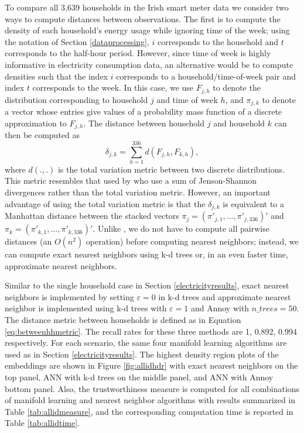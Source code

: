 \documentclass[11pt,a4paper,]{article}
\begin{document}
To compare all 3,639 households in the Irish smart meter data we consider two ways to compute distances between observations. The first is to compute the density of each household's energy usage while ignoring time of the week; using the notation of Section \ref{dataprocessing}, \(i\) corresponds to the household and \(t\) corresponds to the half-hour period. However, since time of week is highly informative in electricity consumption data, an alternative would be to compute densities such that the index \(i\) corresponds to a household/time-of-week pair and index \(t\) corresponds to the week. In this case, we use \(F_{j,h}\) to denote the distribution corresponding to household \(j\) and time of week \(h\), and \(\pi_{j,k}\) to denote a vector whose entries give values of a probability mass function of a discrete approximation to \(F_{j,h}\). The distance between household \(j\) and household \(k\) can then be computed as
\begin{equation}\label{eq:betweenhhmetric}
  \delta_{j,k}=\sum\limits_{h=1}^{336}d(F_{j,h},F_{k,h}),
\end{equation}
where \(d(.,.)\) is the total variation metric between two discrete distributions. This metric resembles that used by \textcite{Hyndman2018-nq} who use a sum of Jenson-Shannon divergences rather than the total variation metric. However, an important advantage of using the total variation metric is that the \(\delta_{j,k}\) is equivalent to a Manhattan distance between the stacked vectors \(\pi_j=(\pi'_{j,1},\ldots,\pi'_{j,336})'\) and \(\pi_k=(\pi'_{k,1},\ldots,\pi'_{k,336})'\). Unlike \textcite{Hyndman2018-nq}, we do not have to compute all pairwise distances (an \(O(n^2)\) operation) before computing nearest neighbors; instead, we can compute exact nearest neighbors using k-d trees or, in an even faster time, approximate nearest neighbors.

Similar to the single household case in Section \ref{electricityresults}, exact nearest neighbors is implemented by setting \(\varepsilon=0\) in k-d trees and approximate nearest neighbor is implemented using k-d trees with \(\varepsilon=1\) and Annoy with \(\textit{n\_trees}=50\). The distance metric between households is defined as in Equation \eqref{eq:betweenhhmetric}. The recall rates for these three methods are 1, 0.892, 0.994 respectively. For each scenario, the same four manifold learning algorithms are used as in Section \ref{electricityresults}. The highest density region plots of the embeddings are shown in Figure \ref{fig:allidhdr} with exact nearest neighbors on the top panel, ANN with k-d trees on the middle panel, and ANN with Annoy bottom panel. Also, the trustworthiness measure is computed for all combinations of manifold learning and nearest neighbor algorithms with results summarized in Table \ref{tab:allidmeasure}, and the corresponding computation time is reported in Table \ref{tab:allidtime}.
\end{document}
